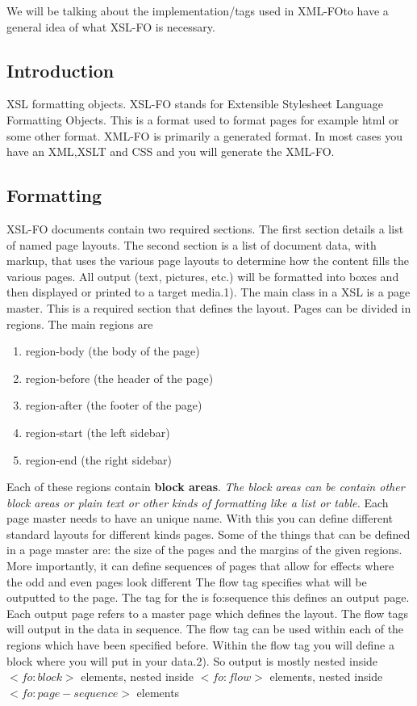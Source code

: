 We will be talking about the implementation/tags used in XML-FOto have a general idea of what XSL-FO is necessary.

\subsection{Introduction}


XSL formatting objects. XSL-FO stands for Extensible Stylesheet Language Formatting Objects. This is a format used to format pages for example html or some other format. XML-FO is primarily a generated format. In most cases you have an XML,XSLT and CSS and you will generate the XML-FO.
\subsection{Formatting}

XSL-FO documents contain two required sections. The first section details a list of named page layouts. The second section is a list of document data, with markup, that uses the various page layouts to determine how the content fills the various pages. All output (text, pictures, etc.) will be formatted into boxes and then displayed or printed to a target media.1). The main class in a XSL is a page master. This is a required section that defines the layout. Pages can be divided in regions. The main regions are

\begin{enumerate}
	\item region-body (the body of the page)
    \item region-before (the header of the page)
    \item region-after (the footer of the page)
    \item region-start (the left sidebar)
    \item region-end (the right sidebar)
\end{enumerate}


Each of these regions contain \textbf{block areas}. \textit{The block areas can be contain {\color{red}other block areas} or {\color{red}plain text} or other kinds of formatting like a list or table.} Each page master needs to have an unique name. With this you can define different standard layouts for different kinds pages. Some of the things that can be defined in a page master are: the size of the pages and the margins of the given regions. More importantly, it can define sequences of pages that allow for effects where the odd and even pages look different The flow tag specifies what will be outputted to the page. The tag for the is fo:sequence this defines an output page. Each output page refers to a master page which defines the layout. The flow tags will output in the data in sequence. The flow tag can be used within each of the regions which have been specified before. Within the flow tag you will define a block where you will put in your data.2). So output is mostly nested inside $<fo:block>$ elements, nested inside $<fo:flow>$ elements, nested inside $<fo:page-sequence>$ elements

